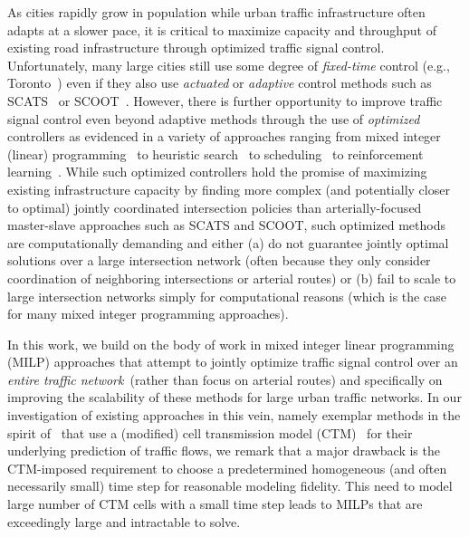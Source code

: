 As cities rapidly grow in population while urban traffic
infrastructure often adapts at a slower pace, it is critical to
maximize capacity and throughput of existing road infrastructure
through optimized traffic signal control.  Unfortunately, many large
cities still use some degree of \emph{fixed-time} control (e.g.,
Toronto~) even if they also use
\emph{actuated} or \emph{adaptive} control methods such as SCATS~
or SCOOT~.  However, there is
further opportunity to improve traffic signal control even beyond
adaptive methods through the use of \emph{optimized} controllers as
evidenced in a variety of approaches ranging from mixed integer
(linear)
programming~
to heuristic search~ to
scheduling~ to reinforcement
learning~.  While such optimized controllers
hold the promise of maximizing existing infrastructure capacity by
finding more complex (and potentially closer to optimal) jointly
coordinated intersection policies than arterially-focused master-slave
approaches such as SCATS and SCOOT, such optimized methods are
computationally demanding
and either (a) do not guarantee jointly optimal solutions over a large
intersection network (often because they only consider coordination of
neighboring intersections or arterial routes) or (b) fail to scale to
large intersection networks simply for computational reasons (which is
the case for many mixed integer programming approaches).

In this work, we build on the body of work in mixed integer linear
programming (MILP) approaches that attempt to jointly optimize traffic
signal control over an \emph{entire traffic network}~(rather than
focus on arterial routes) and specifically on improving the
scalability of these methods for large urban traffic networks.  In our
investigation of existing approaches in this vein, namely exemplar
methods in the spirit of~ that
use a (modified) cell transmission model
(CTM)~ for their underlying
prediction of traffic flows, we remark that a major drawback is the
CTM-imposed requirement to choose a predetermined homogeneous (and
often necessarily small) time step for reasonable modeling fidelity.
This need to model large number of CTM cells with a small time step
leads to MILPs that are exceedingly large and intractable to
solve. %

